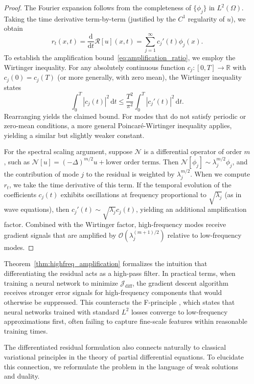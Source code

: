 \documentclass[11pt,reqno]{amsart}
\theoremstyle{plain}
\theoremstyle{definition}
\theoremstyle{remark}
\begin{document}
\begin{proof}
The Fourier expansion follows from the completeness of $\{\phi_j\}$ in $L^2(\Omega)$. Taking the time derivative term-by-term (justified by the $C^1$ regularity of $u$), we obtain
\[
r_t(x,t) = \frac{\mathrm{d}}{\mathrm{d}t}\mathcal{R}[u](x,t) = \sum_{j=1}^\infty c_j'(t) \phi_j(x).
\]
To establish the amplification bound~\eqref{eq:amplification_ratio}, we employ the Wirtinger inequality. For any absolutely continuous function $c_j: [0,T] \to \mathbb{R}$ with $c_j(0) = c_j(T)$ (or more generally, with zero mean), the Wirtinger inequality states
\[
\int_0^T |c_j(t)|^2 \, \mathrm{d}t \leq \frac{T^2}{\pi^2} \int_0^T |c_j'(t)|^2 \, \mathrm{d}t.
\]
Rearranging yields the claimed bound. For modes that do not satisfy periodic or zero-mean conditions, a more general Poincaré-Wirtinger inequality applies, yielding a similar but slightly weaker constant.

For the spectral scaling argument, suppose $\mathcal{N}$ is a differential operator of order $m$, such as $\mathcal{N}[u] = (-\Delta)^{m/2} u + \text{lower order terms}$. Then $\mathcal{N}[\phi_j] \sim \lambda_j^{m/2} \phi_j$, and the contribution of mode $j$ to the residual is weighted by $\lambda_j^{m/2}$. When we compute $r_t$, we take the time derivative of this term. If the temporal evolution of the coefficients $c_j(t)$ exhibits oscillations at frequency proportional to $\sqrt{\lambda_j}$ (as in wave equations), then $c_j'(t) \sim \sqrt{\lambda_j} c_j(t)$, yielding an additional amplification factor. Combined with the Wirtinger factor, high-frequency modes receive gradient signals that are amplified by $\mathcal{O}(\lambda_j^{(m+1)/2})$ relative to low-frequency modes.
\end{proof}

Theorem~\ref{thm:highfreq_amplification} formalizes the intuition that differentiating the residual acts as a high-pass filter. In practical terms, when training a neural network to minimize $\mathcal{J}_{\mathrm{diff}}$, the gradient descent algorithm receives stronger error signals for high-frequency components that would otherwise be suppressed. This counteracts the F-principle \cite{rahaman2019}, which states that neural networks trained with standard $L^2$ losses converge to low-frequency approximations first, often failing to capture fine-scale features within reasonable training times.

The differentiated residual formulation also connects naturally to classical variational principles in the theory of partial differential equations. To elucidate this connection, we reformulate the problem in the language of weak solutions and duality.
\end{document}

